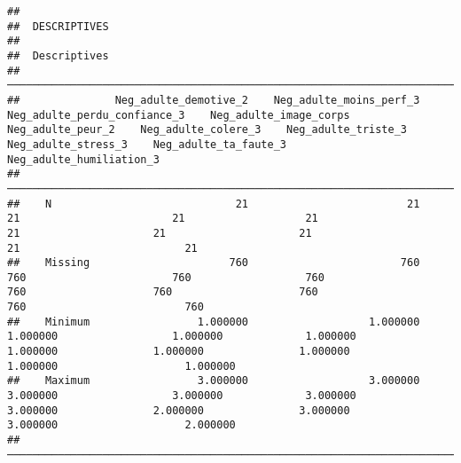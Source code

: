 \documentclass[
]{article}
\begin{document}
\begin{verbatim}
## 
##  DESCRIPTIVES
## 
##  Descriptives                                                                                                                                                                                                                                                             
##  ──────────────────────────────────────────────────────────────────────────────────────────────────────────────────────────────────────────────────────────────────────────────────────────────────────────────────────────────────────────────────────────────────────── 
##               Neg_adulte_demotive_2    Neg_adulte_moins_perf_3    Neg_adulte_perdu_confiance_3    Neg_adulte_image_corps    Neg_adulte_peur_2    Neg_adulte_colere_3    Neg_adulte_triste_3    Neg_adulte_stress_3    Neg_adulte_ta_faute_3    Neg_adulte_humiliation_3   
##  ──────────────────────────────────────────────────────────────────────────────────────────────────────────────────────────────────────────────────────────────────────────────────────────────────────────────────────────────────────────────────────────────────────── 
##    N                             21                         21                              21                        21                   21                     21                     21                     21                       21                          21   
##    Missing                      760                        760                             760                       760                  760                    760                    760                    760                      760                         760   
##    Minimum                 1.000000                   1.000000                        1.000000                  1.000000             1.000000               1.000000               1.000000               1.000000                 1.000000                    1.000000   
##    Maximum                 3.000000                   3.000000                        3.000000                  3.000000             3.000000               3.000000               2.000000               3.000000                 3.000000                    2.000000   
##  ────────────────────────────────────────────────────────────────────────────────────────────────────────────────────────────────────────────────────────────────────────────────────────────────────────────────────────────────────────────────────────────────────────
\end{verbatim}
\end{document}
